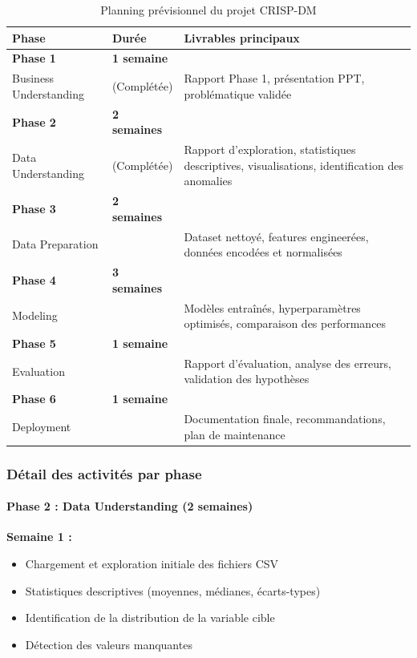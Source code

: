 \documentclass[12pt,a4paper]{article}
\begin{document}
\begin{table}[h]
\centering
\begin{tabular}{@{}llp{7cm}@{}}
\toprule
\textbf{Phase} & \textbf{Durée} & \textbf{Livrables principaux} \\ \midrule
\textbf{Phase 1} & \textbf{1 semaine} & \\
Business Understanding & (Complétée) & Rapport Phase 1, présentation PPT, problématique validée \\[0.3cm]

\textbf{Phase 2} & \textbf{2 semaines} & \\
Data Understanding & (Complétée) & Rapport d'exploration, statistiques descriptives, visualisations, identification des anomalies \\[0.3cm]

\textbf{Phase 3} & \textbf{2 semaines} & \\
Data Preparation & & Dataset nettoyé, features engineerées, données encodées et normalisées \\[0.3cm]

\textbf{Phase 4} & \textbf{3 semaines} & \\
Modeling & & Modèles entraînés, hyperparamètres optimisés, comparaison des performances \\[0.3cm]

\textbf{Phase 5} & \textbf{1 semaine} & \\
Evaluation & & Rapport d'évaluation, analyse des erreurs, validation des hypothèses \\[0.3cm]

\textbf{Phase 6} & \textbf{1 semaine} & \\
Deployment & & Documentation finale, recommandations, plan de maintenance \\ \bottomrule
\end{tabular}
\caption{Planning prévisionnel du projet CRISP-DM}
\end{table}

\subsubsection{Détail des activités par phase}

\paragraph{Phase 2 : Data Understanding (2 semaines)}

\textbf{Semaine 1 :}
\begin{itemize}[leftmargin=*]
    \item Chargement et exploration initiale des fichiers CSV
    \item Statistiques descriptives (moyennes, médianes, écarts-types)
    \item Identification de la distribution de la variable cible
    \item Détection des valeurs manquantes
\end{itemize}
\end{document}
